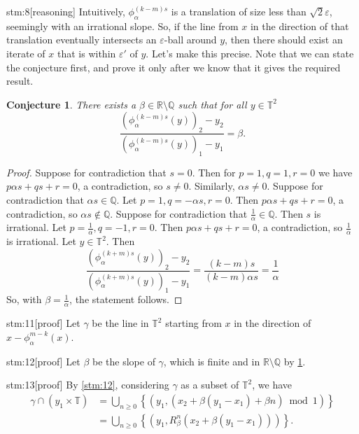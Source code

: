 \documentclass{article}
\newtheorem{conj}{Conjecture}
\begin{document}
\begin{stm}{stm:8}[reasoning]
Intuitively, $\phi_\alpha^{(k-m)s}$ is a translation of size less than $\sqrt{2} \varepsilon$, seemingly with an irrational slope. So, if the line from $x$ in the direction of that translation eventually intersects an $\varepsilon$-ball around $y$, then there should exist an iterate of $x$ that is within $\varepsilon'$ of $y$. Let's make this precise. Note that we can state the conjecture first, and prove it only after we know that it gives the required result.
\end{stm}

\begin{conj}\label{conj:slope}
There exists a  $\beta \in \mathbb{R} \setminus \mathbb{Q}$ such that for all $y \in \mathbb{T}^2$
\[
\frac{(\phi_\alpha^{(k-m)s}(y))_2 - y_2}{(\phi_\alpha^{(k-m)s}(y))_1 - y_1} = \beta.
\]
\end{conj}

\begin{proof}
    Suppose for contradiction that $s = 0$. Then for $p = 1, q = 1, r = 0$ we have $p \alpha s + q s + r = 0$, a contradiction, so $s \ne 0$. Similarly, $\alpha s \ne 0$. Suppose for contradiction that $\alpha s \in \mathbb{Q}$. Let $p = 1, q = -\alpha s, r = 0$. Then $p \alpha s + q s + r = 0$, a contradiction, so $\alpha s \not\in \mathbb{Q}$. Suppose for contradiction that $\frac{1}{\alpha} \in \mathbb{Q}$. Then $s$ is irrational. Let $p = \frac{1}{\alpha}, q = -1, r = 0$. Then $p \alpha s + q s + r = 0$, a contradiction, so $\frac{1}{\alpha}$ is irrational. Let $y \in \mathbb{T}^2$. Then $$\frac{(\phi_\alpha^{(k+m)s}(y))_2 - y_2}{(\phi_\alpha^{(k+m)s}(y))_1 - y_1} = \frac{(k-m)s}{(k-m)\alpha s} = \frac{1}{\alpha}$$
    So, with $\beta = \frac{1}{\alpha}$, the statement follows.
\end{proof}

\begin{stm}{stm:11}[proof]
Let $\gamma$ be the line in $\mathbb{T}^2$ starting from $x$ in the direction of $x - \phi_\alpha^{m-k}(x)$.
\end{stm}

\begin{stm}{stm:12}[proof]
Let $\beta$ be the slope of $\gamma$, which is finite and in $\mathbb{R} \setminus \mathbb{Q}$ by \ref{conj:slope}.
\end{stm}

\begin{stm}{stm:13}[proof]
By \ref{stm:12}, considering $\gamma$ as a subset of $\mathbb{T}^2$, we have
\begin{align*}
\gamma \cap (y_1 \times \mathbb{T})
&= \bigcup_{n \ge 0} \left\{ \left( y_1, (x_2 + \beta(y_1 - x_1) + \beta n) \bmod 1 \right) \right\} \\
&= \bigcup_{n \ge 0} \left\{ \left( y_1, R_\beta^n(x_2 + \beta(y_1 - x_1)) \right) \right\}.
\end{align*}
\end{stm}
\end{document}

